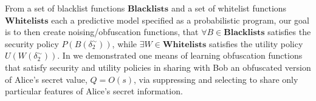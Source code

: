 \documentclass{article} %
\newcommand{\blacklists}[0]{\textbf{Blacklists}}
\newcommand{\whitelists}[0]{\textbf{Whitelists}}
\theoremstyle{plain} %
\theoremstyle{definition} %
\begin{document}
From a set of blacklist functions $\blacklists$ and a set of whitelist
functions $\whitelists$ each a predictive model specified as a
probabilistic program, our goal is to then create noising/obfuscation
functions, that $ \forall B \in \blacklists $ satisfies the security
policy $ P(B(\delta_2^\sim)) $, while $ \exists W \in \whitelists $
satisfies the utility policy $ U(W(\delta_2^\sim)) $.  In
\cite{chakraborty12balancing} we demonstrated one means of learning
obfuscation functions that satisfy security and utility policies in
sharing with Bob an obfuscated version of Alice's secret value, $ Q =
O(s) $, via suppressing and selecting to share only particular
features of Alice's secret information.





\end{document}

